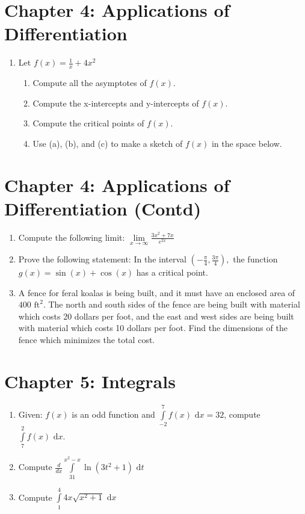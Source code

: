\documentclass{article}
\begin{document}
\section*{Chapter 4: Applications of Differentiation}
\begin{enumerate}
    \item Let $f(x) = \frac{1}{x}+4x^2$
    \begin{enumerate}
        \item Compute all the asymptotes of $f(x)$.
        \item Compute the x-intercepts and y-intercepts of $f(x)$.
        \item Compute the critical points of $f(x)$.
        \item Use (a), (b), and (c) to make a sketch of $f(x)$ in the space below.
    \end{enumerate}
\end{enumerate}
\newpage
\section*{Chapter 4: Applications of Differentiation (Contd)}
\begin{enumerate}
    \item Compute the following limit: $\lim\limits_{x \to \infty} \frac{3x^2+7x}{e^{2x}}$
    \vfill
    \item Prove the following statement: In the interval $(-\frac{\pi}{4}, \frac{3\pi}{4}),$ the function $g(x) = \sin(x)+\cos(x)$ has a critical point.
    \vfill
    \item A fence for feral koalas is being built, and it must have an enclosed area of $400 \text{ ft}^2$. The north and south sides of the fence are being built with material which costs 20 dollars per foot, and the east and west sides are being built with material which costs 10 dollars per foot. Find the dimensions of the fence which minimizes the total cost.
    \vfill
\end{enumerate}
\newpage
\section*{Chapter 5: Integrals}
\begin{enumerate}
    \item Given: $f(x)$ is an odd function and $\int\limits_{-2}^7 f(x) \text{ d}x = 32$, compute $\int\limits_{7}^2 f(x) \text{ d}x$.
    \vfill
    \item Compute $\frac{d}{dx} \int\limits_{31}^{x^2-x} \ln(3t^2+1) \text{ d}t$
    \vfill
    \item Compute $\int\limits_{1}^4 4x\sqrt{x^2+1} \text{ d}x$
    \vfill
\end{enumerate}
\newpage
\end{document}

